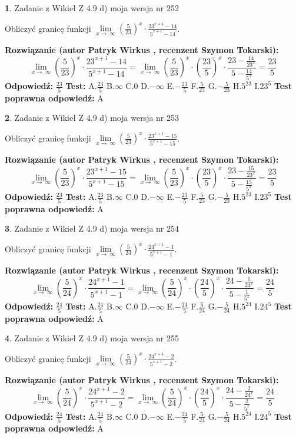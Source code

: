\documentclass[12pt, a4paper]{article}
\theoremstyle{definition} %
\newtheorem{zad}{}
\newcommand{\zadStart}[1]{\begin{zad}#1\newline}
\newcommand{\zadStop}{\end{zad}}
\newcommand{\rozwStart}[2]{\noindent \textbf{Rozwiązanie (autor #1 , recenzent #2): }\newline}
\newcommand{\rozwStop}{\newline}
\newcommand{\odpStart}{\noindent \textbf{Odpowiedź:}\newline}
\newcommand{\odpStop}{\newline}
\newcommand{\testStart}{\noindent \textbf{Test:}\newline}
\newcommand{\testStop}{\newline}
\newcommand{\kluczStart}{\noindent \textbf{Test poprawna odpowiedź:}\newline}
\newcommand{\kluczStop}{\newline}
\begin{document}
\zadStart{Zadanie z Wikieł Z 4.9 d) moja wersja nr 252}


Obliczyć granicę funkcji  $\lim\limits_{x\to\ \infty}(\frac{5}{23})^{x}\cdot\frac{23^{x+1}-14}{5^{x+1}-14}$.
\zadStop
\rozwStart{Patryk Wirkus}{Szymon Tokarski}
$$\lim\limits_{x\to\ \infty}(\frac{5}{23})^{x}\cdot\frac{23^{x+1}-14}{5^{x+1}-14}=\lim\limits_{x\to\ \infty}(\frac{5}{23})^{x}\cdot(\frac{23}{5})^{x} \cdot \frac{23-\frac{14}{23^{x}}}{5-\frac{14}{5^{x}}} = \frac{23}{5}$$
\rozwStop
\odpStart
$\frac{23}{5}$
\odpStop
\testStart
A.$\frac{23}{5}$ B.$\infty$ C.$0$ D.$-\infty$ E.$-\frac{23}{5}$
F.$\frac{5}{23}$ G.$-\frac{5}{23}$
H.$5^{23}$
I.$23^{5}$
\testStop
\kluczStart
A
\kluczStop



\zadStart{Zadanie z Wikieł Z 4.9 d) moja wersja nr 253}


Obliczyć granicę funkcji  $\lim\limits_{x\to\ \infty}(\frac{5}{23})^{x}\cdot\frac{23^{x+1}-15}{5^{x+1}-15}$.
\zadStop
\rozwStart{Patryk Wirkus}{Szymon Tokarski}
$$\lim\limits_{x\to\ \infty}(\frac{5}{23})^{x}\cdot\frac{23^{x+1}-15}{5^{x+1}-15}=\lim\limits_{x\to\ \infty}(\frac{5}{23})^{x}\cdot(\frac{23}{5})^{x} \cdot \frac{23-\frac{15}{23^{x}}}{5-\frac{15}{5^{x}}} = \frac{23}{5}$$
\rozwStop
\odpStart
$\frac{23}{5}$
\odpStop
\testStart
A.$\frac{23}{5}$ B.$\infty$ C.$0$ D.$-\infty$ E.$-\frac{23}{5}$
F.$\frac{5}{23}$ G.$-\frac{5}{23}$
H.$5^{23}$
I.$23^{5}$
\testStop
\kluczStart
A
\kluczStop



\zadStart{Zadanie z Wikieł Z 4.9 d) moja wersja nr 254}


Obliczyć granicę funkcji  $\lim\limits_{x\to\ \infty}(\frac{5}{24})^{x}\cdot\frac{24^{x+1}-1}{5^{x+1}-1}$.
\zadStop
\rozwStart{Patryk Wirkus}{Szymon Tokarski}
$$\lim\limits_{x\to\ \infty}(\frac{5}{24})^{x}\cdot\frac{24^{x+1}-1}{5^{x+1}-1}=\lim\limits_{x\to\ \infty}(\frac{5}{24})^{x}\cdot(\frac{24}{5})^{x} \cdot \frac{24-\frac{1}{24^{x}}}{5-\frac{1}{5^{x}}} = \frac{24}{5}$$
\rozwStop
\odpStart
$\frac{24}{5}$
\odpStop
\testStart
A.$\frac{24}{5}$ B.$\infty$ C.$0$ D.$-\infty$ E.$-\frac{24}{5}$
F.$\frac{5}{24}$ G.$-\frac{5}{24}$
H.$5^{24}$
I.$24^{5}$
\testStop
\kluczStart
A
\kluczStop



\zadStart{Zadanie z Wikieł Z 4.9 d) moja wersja nr 255}


Obliczyć granicę funkcji  $\lim\limits_{x\to\ \infty}(\frac{5}{24})^{x}\cdot\frac{24^{x+1}-2}{5^{x+1}-2}$.
\zadStop
\rozwStart{Patryk Wirkus}{Szymon Tokarski}
$$\lim\limits_{x\to\ \infty}(\frac{5}{24})^{x}\cdot\frac{24^{x+1}-2}{5^{x+1}-2}=\lim\limits_{x\to\ \infty}(\frac{5}{24})^{x}\cdot(\frac{24}{5})^{x} \cdot \frac{24-\frac{2}{24^{x}}}{5-\frac{2}{5^{x}}} = \frac{24}{5}$$
\rozwStop
\odpStart
$\frac{24}{5}$
\odpStop
\testStart
A.$\frac{24}{5}$ B.$\infty$ C.$0$ D.$-\infty$ E.$-\frac{24}{5}$
F.$\frac{5}{24}$ G.$-\frac{5}{24}$
H.$5^{24}$
I.$24^{5}$
\testStop
\kluczStart
A
\kluczStop
\end{document}
